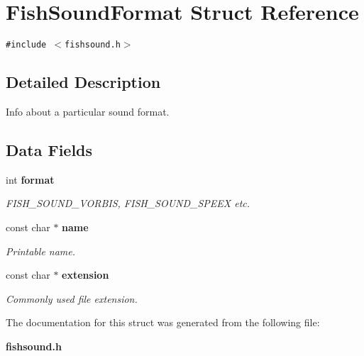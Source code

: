 \section{Fish\-Sound\-Format Struct Reference}
\label{structFishSoundFormat}
{\tt \#include $<$fishsound.h$>$}



\subsection{Detailed Description}
Info about a particular sound format. 

\subsection*{Data Fields}
\begin{CompactItemize}
\item 
int {\bf format}\label{structFishSoundFormat_o0}

\begin{CompactList}\small\item\em FISH\_\-SOUND\_\-VORBIS, FISH\_\-SOUND\_\-SPEEX etc. \item\end{CompactList}\item 
const  char $\ast$ {\bf name}\label{structFishSoundFormat_o1}

\begin{CompactList}\small\item\em Printable name. \item\end{CompactList}\item 
const  char $\ast$ {\bf extension}\label{structFishSoundFormat_o2}

\begin{CompactList}\small\item\em Commonly used file extension. \item\end{CompactList}\end{CompactItemize}


The documentation for this struct was generated from the following file:\begin{CompactItemize}
\item 
{\bf fishsound.h}\end{CompactItemize}
